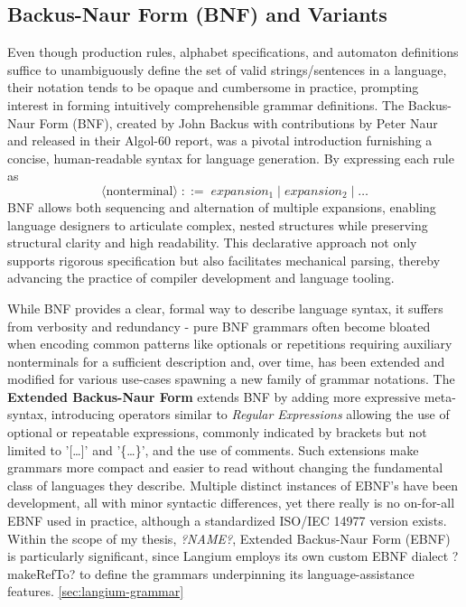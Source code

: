 \subsection{Backus-Naur Form (BNF) and Variants}
Even though production rules, alphabet specifications, and automaton definitions suffice to unambiguously define the set of valid strings/sentences in a language, their notation
tends to be opaque and cumbersome in practice, prompting interest in forming intuitively comprehensible grammar definitions. The Backus-Naur Form (BNF),
created by John Backus with contributions by Peter Naur and released in their Algol-60 report\cite{ALGOL60}, was a pivotal introduction furnishing a concise, human-readable syntax for language generation.
By expressing each rule as
\[
  \langle\mathrm{nonterminal}\rangle \;::=\; expansion_1 \;|\; expansion_2 \;|\;\dots
\]
BNF allows both sequencing and alternation of multiple expansions, enabling language designers to articulate complex, nested structures while preserving structural
clarity and high readability.
This declarative approach not only supports rigorous specification but also facilitates mechanical parsing, thereby advancing the practice of compiler development and
language tooling.

While BNF provides a clear, formal way to describe language syntax, it suffers from verbosity and redundancy - pure BNF grammars often become bloated when encoding
common patterns like optionals or repetitions requiring auxiliary nonterminals for a sufficient description and, over time, has been extended and modified for various
use-cases spawning a new family of grammar notations. The \textbf{Extended Backus-Naur Form} extends BNF by adding more expressive meta-syntax, introducing operators
similar to \textit{Regular Expressions} allowing the use of optional or repeatable expressions, commonly indicated by brackets but not limited to '[\dots]' and '\{\dots\}',
and the use of comments. Such extensions make grammars more compact and easier to read without changing the fundamental class of languages they describe.
Multiple distinct instances of EBNF's have been development, all with minor syntactic differences, yet there really is no on-for-all EBNF used in practice, although
a standardized ISO/IEC 14977 version exists. \cite{jinks2004bnf,jinks2004ebnfvariants}\\
Within the scope of my thesis, \textit{?NAME?}, Extended Backus-Naur Form (EBNF) is particularly significant, since Langium employs its own custom EBNF dialect ?makeRefTo?
to define the grammars underpinning its language-assistance features. \ref{sec:langium-grammar}

